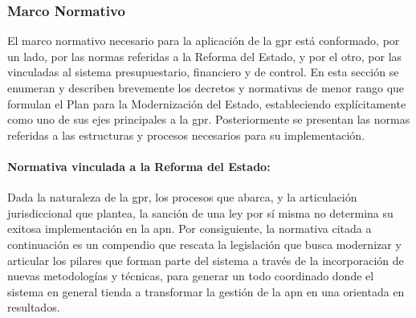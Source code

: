 \subsubsection{Marco Normativo}\label{marco-normativo}

El marco normativo necesario para la aplicación de la \ac{gpr} está conformado, por un lado, por las normas referidas a la Reforma del Estado, y por el otro, por las vinculadas al sistema presupuestario, financiero y de control. En esta sección se enumeran y describen brevemente los decretos y normativas de menor rango que formulan el Plan para la Modernización del Estado, estableciendo explícitamente como uno de sus ejes principales a la \ac{gpr}. Posteriormente se presentan las normas referidas a las estructuras y procesos necesarios para su implementación.

\paragraph{Normativa vinculada a la Reforma del Estado:} Dada la naturaleza de la \ac{gpr}, los procesos que abarca, y la articulación jurisdiccional que plantea, la sanción de una ley por sí misma no determina su exitosa implementación en la \ac{apn}. Por consiguiente, la normativa citada a continuación es un compendio que rescata la legislación que busca modernizar y articular los pilares que forman parte del sistema a través de la incorporación de nuevas metodologías y técnicas, para generar un todo coordinado donde el sistema en general tienda a transformar la gestión de la \ac{apn} en una orientada en resultados.

